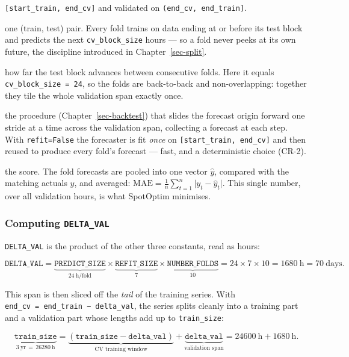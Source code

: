 \documentclass[
  english,
  letterpaper,
]{scrbook}
\begin{document}
\begin{description}
\texttt{{[}start\_train,\ end\_cv{]}} and validated on
\texttt{(end\_cv,\ end\_train{]}}.
\item[Fold]
one (train, test) pair. Every fold trains on data ending at or before
its test block and predicts the next \texttt{cv\_block\_size} hours ---
so a fold never peeks at its own future, the discipline introduced in
Chapter~\ref{sec-split}.
\item[Fold stride]
how far the test block advances between consecutive folds. Here it
equals \texttt{cv\_block\_size\ =\ 24}, so the folds are back-to-back
and non-overlapping: together they tile the whole validation span
exactly once.
\item[Rolling-origin back-test]
the procedure (Chapter~\ref{sec-backtest}) that slides the forecast
origin forward one stride at a time across the validation span,
collecting a forecast at each step. With \texttt{refit=False} the
forecaster is fit \emph{once} on \texttt{{[}start\_train,\ end\_cv{]}}
and then reused to produce every fold's forecast --- fast, and a
deterministic choice (CR-2).
\item[Mean absolute error (MAE)]
the score. The fold forecasts are pooled into one vector \(\hat{y}\),
compared with the matching actuals \(y\), and averaged:
\(\text{MAE} = \tfrac{1}{n}\sum_{t=1}^{n}\lvert y_t - \hat{y}_t\rvert\).
This single number, over all validation hours, is what SpotOptim
minimises.
\end{description}

\subsubsection{\texorpdfstring{Computing
\texttt{DELTA\_VAL}}{Computing DELTA\_VAL}}\label{computing-delta_val}

\texttt{DELTA\_VAL} is the product of the other three constants, read as
hours:

\[
\texttt{DELTA\_VAL}
  = \underbrace{\texttt{PREDICT\_SIZE}}_{24\ \text{h/fold}}
  \times \underbrace{\texttt{REFIT\_SIZE}}_{7}
  \times \underbrace{\texttt{NUMBER\_FOLDS}}_{10}
  = 24 \times 7 \times 10 = 1680\ \text{h} = 70\ \text{days}.
\]

This span is then sliced off the \emph{tail} of the training series.
With \texttt{end\_cv\ =\ end\_train\ −\ delta\_val}, the series splits
cleanly into a training part and a validation part whose lengths add up
to \texttt{train\_size}:

\[
\underbrace{\texttt{train\_size}}_{3\ \text{yr}\,=\,26280\ \text{h}}
  = \underbrace{(\texttt{train\_size} - \texttt{delta\_val})}_{\text{CV training window}}
  + \underbrace{\texttt{delta\_val}}_{\text{validation span}}
  = 24600\ \text{h} + 1680\ \text{h}.
\]
\end{document}
